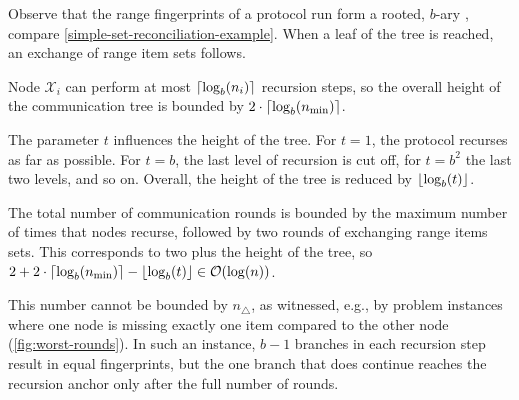 \documentclass[conference]{IEEEtran}
\DeclarePairedDelimiter\ceil{\lceil}{\rceil}
\DeclarePairedDelimiter\floor{\lfloor}{\rfloor}
\begin{document}
Observe that the range fingerprints of a protocol run form a rooted, $b$-ary , compare \cref{simple-set-reconciliation-example}. When a leaf of the tree is reached, an exchange of range item sets follows.

Node $\mathcal{X}_i$ can perform at most $\ceil{\log_{b}(n_i)}$ recursion steps, so the overall height of the communication tree is bounded by $2 \cdot\ceil{\log_{b}(n_{\min})}$.

The parameter $t$ influences the height of the tree. For $t = 1$, the protocol recurses as far as possible. For $t = b$, the last level of recursion is cut off, for $t = b^2$ the last two levels, and so on. Overall, the height of the tree is reduced by $\floor{\log_{b}(t)}$.

The total number of communication rounds is bounded by the maximum number of times that nodes recurse, followed by two rounds of exchanging range items sets. This corresponds to two plus the height of the tree, so $2 + 2 \cdot\ceil{\log_{b}(n_{\min})} - \floor{\log_{b}(t)} \in \complexity{\log(n)}$.

This number cannot be bounded by $n_{\triangle}$, as witnessed, e.g., by problem instances where one node is missing exactly one item compared to the other node (\cref{fig:worst-rounds}). In such an instance, $b - 1$ branches in each recursion step result in equal fingerprints, but the one branch that does continue reaches the recursion anchor only after the full number of rounds.
\end{document}
